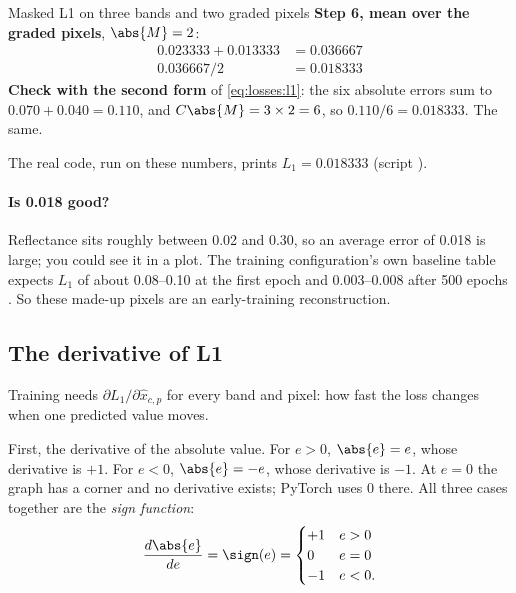 \begin{worked}[label={we:losses:l1}]{Masked L1 on three bands and two graded pixels}
\textbf{Step 6, mean over the graded pixels}, $\abs{M} = 2$:
\begin{align*}
0.023333 + 0.013333 &= 0.036667\\
0.036667 / 2 &= 0.018333
\end{align*}
\textbf{Check with the second form} of \cref{eq:losses:l1}: the six absolute errors sum to
$0.070 + 0.040 = 0.110$, and $C\abs{M} = 3 \times 2 = 6$, so $0.110 / 6 = 0.018333$. The same.

The real code, run on these numbers, prints $L_1 = 0.018333$ \tagC{} (script
).
\end{worked}

\paragraph{Is 0.018 good?} Reflectance sits roughly between 0.02 and 0.30, so an average error
of 0.018 is large; you could see it in a plot. The training configuration's own baseline table
expects $L_1$ of about 0.08--0.10 at the first epoch and 0.003--0.008 after 500
epochs . So these made-up pixels are an early-training
reconstruction.

\subsection{The derivative of L1}\label{sec:losses:l1grad}

Training needs $\partial L_1 / \partial \hat{x}_{c,p}$ for every band and pixel: how fast the
loss changes when one predicted value moves.

First, the derivative of the absolute value. For $e > 0$, $\abs{e} = e$, whose derivative is
$+1$. For $e < 0$, $\abs{e} = -e$, whose derivative is $-1$. At $e = 0$ the graph has a corner
and no derivative exists; PyTorch uses $0$ there. All three cases together are the
\emph{sign function}:
\[
\frac{d\abs{e}}{de} = \sign(e) = \begin{cases} +1 & e > 0\\ 0 & e = 0 \\ -1 & e < 0.\end{cases}
\]

